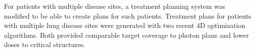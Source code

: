 \documentclass[type=dr, dr=rernat, accentcolor=tud7b,colorbacktitle, bigchapter, openright, twoside, 12pt ]{tudthesis}
\begin{document}
For patients with multiple disease sites, a treatment planning system was modified to be able to create plans for such patients. 
Treatment plans for patients with multiple lung disease sites were generated with two recent 4D optimization algorithms. Both provided
comparable target coverage to photon plans and lower doses to critical structures.
% 
% 
% 
% 
% 
% 
% 
% 
% 
% 
% 
% 
% 
% 
% 
% 


{}
% 
\end{document}

